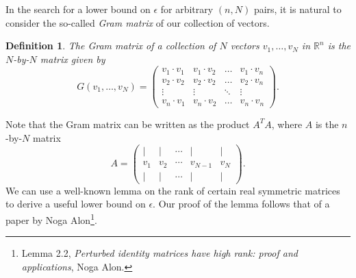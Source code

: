 \documentclass[11pt,letterpaper,twoside,english]{article}
\theoremstyle{theorem}
\newtheorem{definition}[theorem]{Definition}
\theoremstyle{remark}
\begin{document}
In the search for a lower bound on $\epsilon$ for arbitrary $(n, N)$ pairs, it is natural to consider the so-called \emph{Gram matrix} of our collection of vectors. 
\begin{definition}
The Gram matrix of a collection of $N$ vectors $v_1,\ldots, v_N$ in $\mathbb R^n$ is the $N$-by-$N$ matrix given by
\[G(v_1,\ldots, v_N)=\left(\begin{matrix}
v_1\cdot v_1 & v_1\cdot v_2 & \ldots & v_1\cdot v_n\\
v_2\cdot v_2 & v_2\cdot v_2 & \ldots & v_2\cdot v_n\\
\vdots & \vdots & \ddots & \vdots\\
v_n\cdot v_1 & v_n\cdot v_2 & \ldots & v_n\cdot v_n\end{matrix}\right).\]
\end{definition}
Note that the Gram matrix can be written as the product $A^TA$, where $A$ is the $n$-by-$N$ matrix
\[A=\left(\begin{matrix}
| & | & \cdots & | & |\\
v_1 & v_2 & \cdots & v_{N-1} & v_N\\
| & | & \cdots & | & | \end{matrix}\right).\]
We can use a well-known lemma on the rank of certain real symmetric matrices to derive a useful lower bound on $\epsilon$. Our proof of the lemma follows that of a paper by Noga Alon\footnote{Lemma 2.2, \emph{Perturbed identity matrices have high rank: proof and applications}, Noga Alon.}.
\end{document}
